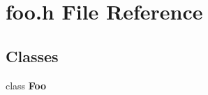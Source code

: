 \section{foo.\+h File Reference}
\label{foo_8h}
\subsection*{Classes}
\begin{DoxyCompactItemize}
\item 
class {\bf Foo}
\end{DoxyCompactItemize}
